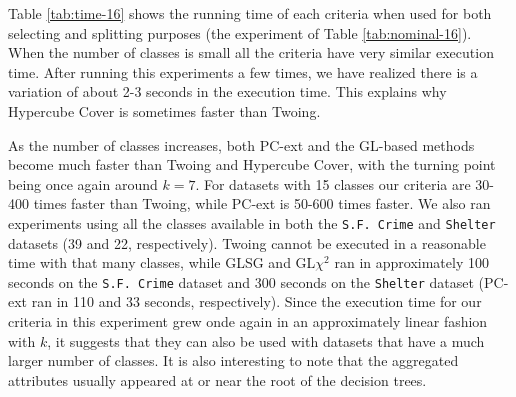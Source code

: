 Table \ref{tab:time-16} shows the running time of each criteria when used for both selecting and splitting purposes (the experiment of Table \ref{tab:nominal-16}).
When the number of classes is small all the criteria have very similar execution time. After running this experiments a few times, we have realized there is a variation of about 2-3 seconds in the execution time. This explains why Hypercube Cover is sometimes faster than Twoing.

As the number of classes increases, both PC-ext and the GL-based methods become much faster than Twoing and Hypercube Cover, with the turning point being once again around $k=7$. For datasets with 15 classes our criteria are 30-400 times faster than Twoing, while PC-ext is 50-600 times faster. We also ran experiments using all the classes available in both the {\tt S.F. Crime} and {\tt Shelter} datasets (39 and 22, respectively). Twoing cannot be executed in a reasonable time with that many classes, while GLSG and GL$\chi^2$ ran in approximately 100 seconds on the {\tt S.F. Crime} dataset and  300 seconds on the {\tt Shelter} dataset (PC-ext ran in 110 and 33 seconds, respectively). Since the execution time for our criteria in this experiment grew onde again in an approximately linear fashion with $k$, it suggests that they can also be used with datasets that have a much larger number of classes. It is also interesting to note that the aggregated attributes usually appeared at or near the root of the decision trees.

